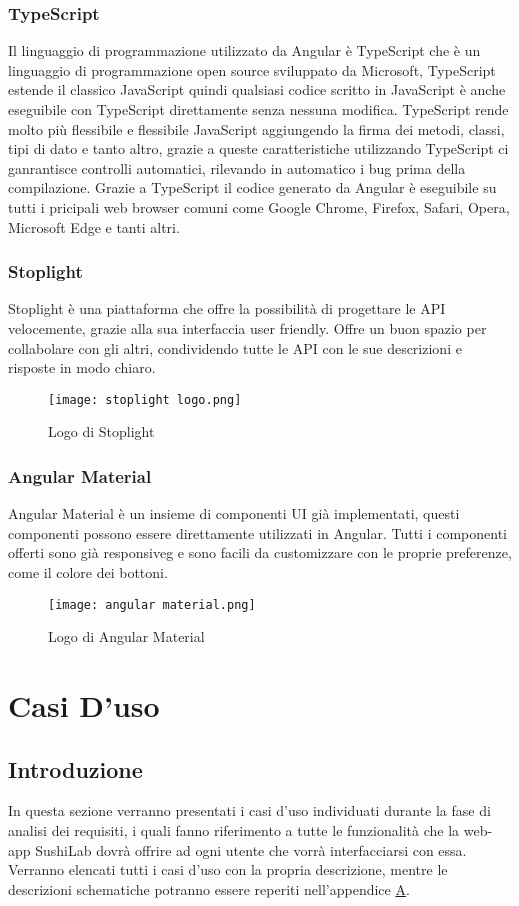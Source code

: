 \subsubsection{TypeScript}
Il linguaggio di programmazione utilizzato da Angular è TypeScript che è un linguaggio di programmazione open source sviluppato da Microsoft, TypeScript estende il classico JavaScript quindi qualsiasi codice scritto in JavaScript è anche eseguibile con TypeScript direttamente senza nessuna modifica. TypeScript rende molto più flessibile e flessibile JavaScript aggiungendo la firma dei metodi, classi, tipi di dato e tanto altro, grazie a queste caratteristiche utilizzando TypeScript ci ganrantisce controlli automatici, rilevando in automatico i bug prima della compilazione. Grazie a TypeScript il codice generato da Angular è eseguibile su tutti i pricipali web browser comuni come Google Chrome, Firefox, Safari, Opera, Microsoft Edge e tanti altri.
\subsubsection{Stoplight}
Stoplight è una piattaforma che offre la possibilità di progettare le API velocemente, grazie alla sua interfaccia user friendly. Offre un buon spazio per collabolare con gli altri, condividendo tutte le API con le sue descrizioni e risposte in modo chiaro.
\begin{figure}[H]
    \centering
    \texttt{[image: stoplight logo.png]}
    \caption{Logo di Stoplight}
\end{figure}
\subsubsection{Angular Material}
Angular Material è un insieme di componenti UI già implementati, questi componenti possono essere direttamente utilizzati in Angular. Tutti i componenti offerti sono già \gls{responsiveg} e sono facili da customizzare con le proprie preferenze, come il colore dei bottoni.
\begin{figure}[H]
    \centering
    \texttt{[image: angular material.png]}
    \caption{Logo di Angular Material}
\end{figure}
\section{Casi D'uso}
\subsection{Introduzione}
In questa sezione verranno presentati i casi d'uso individuati durante la fase di analisi dei requisiti, i quali fanno riferimento a tutte le funzionalità che la web-app SushiLab dovrà offrire ad ogni utente che vorrà interfacciarsi con essa. Verranno elencati tutti i casi d'uso con la propria descrizione, mentre le descrizioni schematiche potranno essere reperiti nell'appendice {\hyperref[cap:appendice a]{A}}.
